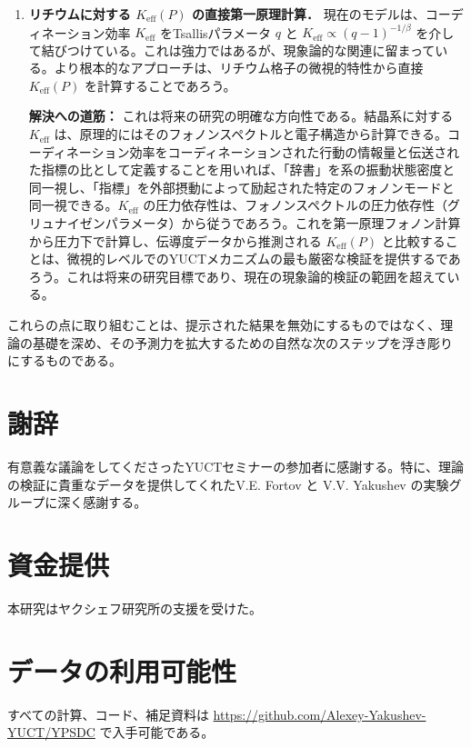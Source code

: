 \documentclass[11pt,a4paper]{article}
\newcommand{\Ke}{K_{\mathrm{eff}}}
\theoremstyle{remark}
\begin{document}
\begin{enumerate}
		\item \textbf{リチウムに対する \(\Ke(P)\) の直接第一原理計算．} 現在のモデルは、コーディネーション効率 \(\Ke\) をTsallisパラメータ \(q\) と \(\Ke \propto (q-1)^{-1/\beta}\) を介して結びつけている。これは強力ではあるが、現象論的な関連に留まっている。より根本的なアプローチは、リチウム格子の微視的特性から直接 \(\Ke(P)\) を計算することであろう。
		
		\textbf{解決への道筋：} これは将来の研究の明確な方向性である。結晶系に対する \(\Ke\) は、原理的にはそのフォノンスペクトルと電子構造から計算できる。コーディネーション効率をコーディネーションされた行動の情報量と伝送された指標の比として定義することを用いれば、「辞書」を系の振動状態密度と同一視し、「指標」を外部摂動によって励起された特定のフォノンモードと同一視できる。\(\Ke\) の圧力依存性は、フォノンスペクトルの圧力依存性（グリュナイゼンパラメータ）から従うであろう。これを第一原理フォノン計算から圧力下で計算し、伝導度データから推測される \(\Ke(P)\) と比較することは、微視的レベルでのYUCTメカニズムの最も厳密な検証を提供するであろう。これは将来の研究目標であり、現在の現象論的検証の範囲を超えている。
	\end{enumerate}
	これらの点に取り組むことは、提示された結果を無効にするものではなく、理論の基礎を深め、その予測力を拡大するための自然な次のステップを浮き彫りにするものである。
	
	\section*{謝辞}
	
	有意義な議論をしてくださったYUCTセミナーの参加者に感謝する。特に、理論の検証に貴重なデータを提供してくれたV.E. Fortov と V.V. Yakushev の実験グループに深く感謝する。
	
	\section*{資金提供}
	
	本研究はヤクシェフ研究所の支援を受けた。
	
	\section*{データの利用可能性}
	
	すべての計算、コード、補足資料は \url{https://github.com/Alexey-Yakushev-YUCT/YPSDC} で入手可能である。
	
\end{document}
